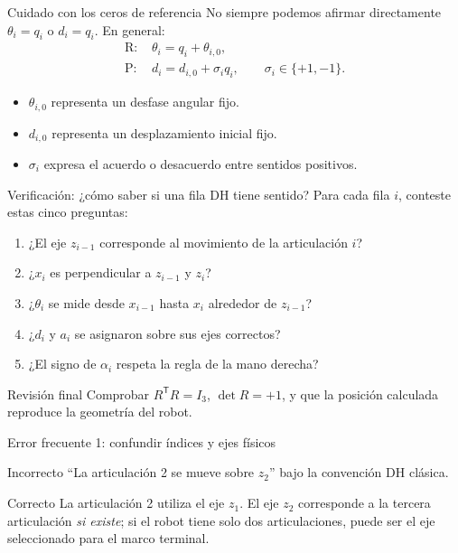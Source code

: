 \documentclass[aspectratio=169,11pt]{beamer}
\begin{document}
\begin{frame}[t]{Cuidado con los ceros de referencia}
 \small
 No siempre podemos afirmar directamente $\theta_i=q_i$
 o $d_i=q_i$. En general:
 \[
 \boxed{\begin{aligned}
 \text{R: }&\theta_i=q_i+\theta_{i,0},\\
 \text{P: }&d_i=d_{i,0}+\sigma_iq_i,
 \qquad\sigma_i\in\{+1,-1\}.
 \end{aligned}}
 \]
 \pause
 \begin{itemize}
  \item $\theta_{i,0}$ representa un desfase angular fijo.
  \item $d_{i,0}$ representa un desplazamiento inicial fijo.
  \item $\sigma_i$ expresa el acuerdo o desacuerdo entre sentidos positivos.
 \end{itemize}
\end{frame}

\begin{frame}[t]{Verificación: ¿cómo saber si una fila DH tiene sentido?}
 \small
 Para cada fila $i$, conteste estas cinco preguntas:
 \begin{enumerate}
  \item ¿El eje $z_{i-1}$ corresponde al movimiento de la articulación $i$?
  \item ¿$x_i$ es perpendicular a $z_{i-1}$ y $z_i$?
  \item ¿$\theta_i$ se mide desde $x_{i-1}$ hasta $x_i$ alrededor de $z_{i-1}$?
  \item ¿$d_i$ y $a_i$ se asignaron sobre sus ejes correctos?
  \item ¿El signo de $\alpha_i$ respeta la regla de la mano derecha?
 \end{enumerate}
 \pause
 \begin{block}{Revisión final}
 Comprobar $R^{\mathsf T}R=I_3$, $\det R=+1$,
 y que la posición calculada reproduce la geometría del robot.
 \end{block}
\end{frame}

\begin{frame}[t]{Error frecuente 1: confundir índices y ejes físicos}
 \small
 \begin{alertblock}{Incorrecto}
 ``La articulación 2 se mueve sobre $z_2$''
 bajo la convención DH clásica.
 \end{alertblock}
 \pause
 \begin{block}{Correcto}
 La articulación 2 utiliza el eje $z_1$.
 El eje $z_2$ corresponde a la tercera articulación
 \emph{si existe}; si el robot tiene solo dos articulaciones,
 puede ser el eje seleccionado para el marco terminal.
 \end{block}
\end{frame}
\end{document}
